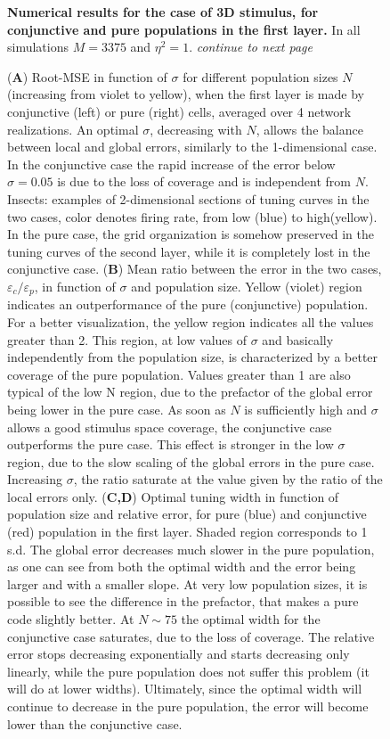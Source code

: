 \documentclass[a4paper]{article}%
\begin{document}
\begin{figure}[p]
\caption{\textbf{Numerical
results for the case of 3D stimulus, for conjunctive and pure populations in
the first layer.} In all simulations $M=3375$ and $\eta^{2} =1$.
\emph{continue to next page}}%
\end{figure}\begin{figure}[t]
\captionsetup{labelformat=adja-page} \ContinuedFloat
\caption[Figure]{ (\textbf{A}) Root-MSE in function of $\sigma$ for different
population sizes $N$ (increasing from violet to yellow), when the first layer
is made by conjunctive (left) or pure (right) cells, averaged over 4 network
realizations. An optimal $\sigma$, decreasing with $N$, allows the balance
between local and global errors, similarly to the 1-dimensional case. In the
conjunctive case the rapid increase of the error below $\sigma=0.05$ is due to
the loss of coverage and is independent from $N$. Insects: examples of
2-dimensional sections of tuning curves in the two cases, color denotes firing
rate, from low (blue) to high(yellow). In the pure case, the grid organization
is somehow preserved in the tuning curves of the second layer, while it is
completely lost in the conjunctive case. (\textbf{B}) Mean ratio between the
error in the two cases, $\varepsilon_{c}/\varepsilon_{p}$, in function of
$\sigma$ and population size. Yellow (violet) region indicates an
outperformance of the pure (conjunctive) population. For a better
visualization, the yellow region indicates all the values greater than 2. This
region, at low values of $\sigma$ and basically independently from the
population size, is characterized by a better coverage of the pure population.
Values greater than 1 are also typical of the low N region, due to the
prefactor of the global error being lower in the pure case. As soon as $N$ is
sufficiently high and $\sigma$ allows a good stimulus space coverage, the
conjunctive case outperforms the pure case. This effect is stronger in the low
$\sigma$ region, due to the slow scaling of the global errors in the pure
case. Increasing $\sigma$, the ratio saturate at the value given by the ratio
of the local errors only. (\textbf{C,D}) Optimal tuning width in function of
population size and relative error, for pure (blue) and conjunctive (red)
population in the first layer. Shaded region corresponds to 1 s.d. The global
error decreases much slower in the pure population, as one can see from both
the optimal width and the error being larger and with a smaller slope. At very
low population sizes, it is possible to see the difference in the prefactor,
that makes a pure code slightly better. At $N\sim75$ the optimal width for the
conjunctive case saturates, due to the loss of coverage. The relative error
stops decreasing exponentially and starts decreasing only linearly, while the
pure population does not suffer this problem (it will do at lower widths).
Ultimately, since the optimal width will continue to decrease in the pure
population, the error will become lower than the conjunctive case.}%
\label{Fig:5}%
\end{figure}\clearpage
\end{document}
